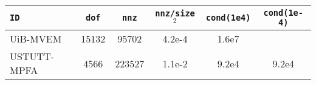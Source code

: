 \documentclass{article}
\begin{document}
\begin{table}
    \centering
    \begin{tabular}{|l|ccccc|}
        \hline
        \texttt{ID} & \texttt{dof} & \texttt{nnz} & \texttt{nnz/size$^2$} &
        \texttt{cond(1e4)} & \texttt{cond(1e-4)} \\ \hline
        UiB-MVEM & 15132 & 95702 & 4.2e-4 & 1.6e7 & \\ \hline
        USTUTT-MPFA & 4566 & 223527 & 1.1e-2 & 9.2e4 & 9.2e4 \\ \hline
    \end{tabular}
\end{table}
\end{document}
